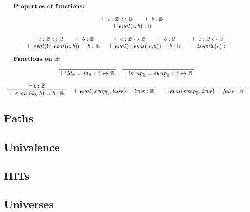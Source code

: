 \documentclass[format=acmlarge,review,natbib]{acmart}
\newcommand{\invc}[1]{!#1}
\newcommand{\evalone}[2]{eval(#1,#2)}
\newcommand{\isequiv}[1]{\mathit{isequiv}(#1)}
\newcommand{\idc}{\mathit{id}}
\newcommand{\swapc}{\mathit{swap}}
\newcommand{\iso}{\leftrightarrow}
\newcommand{\fc}{\mathit{false}}
\newcommand{\tc}{\mathit{true}}
\newcommand{\boolt}{\mathbb{B}}
\newcommand{\proves}{\vdash}
\newcommand{\jdg}[2]{\proves #1 : #2}
\begin{document}
\[\begin{array}{c}
    \noalign{\textbf{Properties of functions:}} \\
    \quad
    \quad
    \AxiomC{$\jdg{c}{\boolt\iso\boolt}$}
    \AxiomC{$\jdg{b}{\boolt}$}
    \BinaryInfC{$\jdg{\evalone{c}{b}}{\boolt}$}
    \DisplayProof
    \\
    \\
    \AxiomC{$\jdg{c}{\boolt\iso\boolt}$}
    \AxiomC{$\jdg{b}{\boolt}$}
    \BinaryInfC{$\jdg{\evalone{\invc{c}}{\evalone{c}{b}} = b}{\boolt}$}
    \DisplayProof
    \quad
    \AxiomC{$\jdg{c}{\boolt\iso\boolt}$}
    \AxiomC{$\jdg{b}{\boolt}$}
    \BinaryInfC{$\jdg{\evalone{c}{\evalone{\invc{c}}{b}} = b}{\boolt}$}
    \DisplayProof
    \quad
    \AxiomC{$\jdg{c}{\boolt\iso\boolt}$}
    \UnaryInfC{$\jdg{\isequiv{c}}{}$}
    \DisplayProof
    \\
    \\
    \noalign{\textbf{Functions on $\boolt$:}} \\
    \AxiomC{}
    \UnaryInfC{$\jdg{\invc{\idc_{\boolt} = \idc_{\boolt}}}{\boolt\iso\boolt}$}
    \DisplayProof
    \quad
    \AxiomC{}
    \UnaryInfC{$\jdg{\invc{\swapc _{\boolt}} = \swapc _{\boolt}}{\boolt\iso\boolt}$}
    \DisplayProof
    \\
    \\
    \AxiomC{$\jdg{b}{\boolt}$}
    \UnaryInfC{$\jdg{\evalone{\idc_{\boolt}}{b} = b}{\boolt}$}
    \DisplayProof
    \quad
    \AxiomC{}
    \UnaryInfC{$\jdg{\evalone{\swapc_{\boolt}}{\fc} = \tc}{\boolt}$}
    \DisplayProof
    \quad
    \AxiomC{}
    \UnaryInfC{$\jdg{\evalone{\swapc_{\boolt}}{\tc} = \fc}{\boolt}$}
    \DisplayProof
\end{array}\]

\subsection{Paths}

\subsection{Univalence}

\subsection{HITs}

\newpage

\subsection{Universes}
\end{document}
